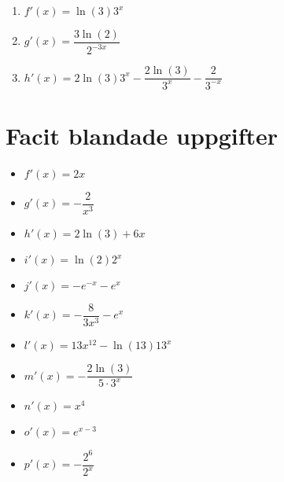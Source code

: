 \documentclass[a4paper, 12pt]{article}
\begin{document}
\begin{facit}
    \begin{multicols}{3}
        \begin{enumerate}
            \item $f'(x) = \ln (3) 3^x$
            \item $g'(x) = \dfrac{3\ln (2)}{2^{-3x}}$
            \item $h'(x) = 2 \ln (3) 3^x - \dfrac{2\ln (3)}{3^x} - \dfrac 2{3^{-x}}$
        \end{enumerate}
    \end{multicols}
\end{facit}

\newpage
\section{Facit blandade uppgifter}

\begin{blufacit}
    \begin{itemize}
        \item $f'(x) = 2x$
        \item $g'(x) = -\dfrac{2}{x^3}$
        \item $h'(x) = 2 \ln(3) + 6x$
        \item $i'(x) = \ln(2) 2^x$
        \item $j'(x) = -e^{-x}- e^x$
        \item $k'(x) = -\dfrac{8}{3x^3}-e^x$
        \item $l'(x) = 13x^{12} - \ln(13)13^x$
        \item $m'(x) = -\dfrac{2\ln(3)}{5\cdot 3^x}$
        \item $n'(x) = x^4$
        \item $o'(x) = e^{x-3}$
        \item $p'(x) = - \dfrac{2^6}{2^x}$
    \end{itemize}
\end{blufacit}
\end{document}
